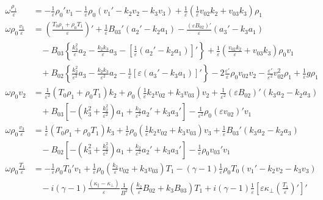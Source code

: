 \documentclass[11pt, fleqn]{article}
\newcommand{\eps}{\varepsilon}
\begin{document}
\begin{equation}
	\begin{aligned}
		\omega \frac{\rho_1}{\eps}		&= -\frac{1}{\eps}\rho_0'v_1 - \frac{1}{\eps}\rho_0\left(v_1' - k_2v_2 - k_3v_3\right) + \frac{1}{\eps}\left(\frac{1}{\eps}v_{02}k_2 + v_{03}k_3\right)\rho_1						\\[8pt]
		\omega \rho_0 \frac{v_1}{\eps}	&= \left(\frac{T_0\rho_1 + \rho_0 T_1}{\eps}\right)' + \frac{1}{\eps}B_{03}'\left(a_2' - k_2a_1\right) - \frac{(\eps B_{02})'}{\eps}\left(a_3' - k_3a_1\right)						\\
										&~~~~ 	- B_{03}\left\{\frac{k_3^2}{\eps}a_2 - \frac{k_2k_3}{\eps}a_3 - \left[\frac{1}{\eps}\left(a_2' - k_2a_1\right)\right]'\right\} 
												+ \frac{1}{\eps}\left(\frac{v_{02}k_2}{\eps}+v_{03}k_3\right)\rho_0v_1																										\\
										&~~~~ 	+ B_{02}\left\{\frac{k_2^2}{\eps^2}a_3 - \frac{k_2k_3}{\eps^2}a_2 - \frac{1}{\eps}\left[\eps\left(a_3' - k_3a_1\right)\right]'\right\} 
												- 2\frac{\eps'}{\eps}\rho_0v_{02}v_2 - \frac{\eps'}{\eps^2}v_{02}^2\rho_1  + \frac{1}{\eps}g\rho_1																		 	\\[8pt]
		\omega \rho_0 v_2				&= \frac{1}{\eps^2}(T_0\rho_1 + \rho_0T_1)k_2 + \rho_0\left(\frac{1}{\eps}k_2v_{02} + k_3v_{03}\right)v_2 + \frac{1}{\eps^2}(\eps B_{02})'\left(k_3a_2 - k_2a_3\right)				\\
										&~~~~ 	+ B_{03}\left[-\left(k_3^2 + \frac{k_2^2}{\eps^2}\right)a_1 + \frac{k_2}{\eps^2}a_2' + k_3a_3'\right] - \frac{1}{\eps^2}\rho_0(\eps v_{02})'v_1								\\[8pt]
		\omega \rho_0 \frac{v_3}{\eps} 	&= \frac{1}{\eps}(T_0 \rho_1 + \rho_0 T_1)k_3 + \frac{1}{\eps}\rho_0\left(\frac{1}{\eps}k_2v_{02} + k_3v_{03}\right)v_3 + \frac{1}{\eps}B_{03}'\left(k_3a_2 - k_2a_3\right)			\\
										&~~~~ 	- B_{02}\left[-\left(k_3^2 + \frac{k_2^2}{\eps^2}\right)a_1 + \frac{k_2}{\eps^2}a_2' + k_3a_3'\right] - \frac{1}{\eps}\rho_0v_{03}'v_1										\\[8pt]
		\omega \rho_0 \frac{T_1}{\eps}	&= -\frac{1}{\eps}\rho_0T_0'v_1 + \frac{1}{\eps}\rho_0\left(\frac{k_2}{\eps}v_{02} + k_3v_{03}\right)T_1 - (\gamma - 1)\frac{1}{\eps}\rho_0T_0\left(v_1' - k_2v_2 - k_3v_3\right) 	\\
										&~~~~ 	- i(\gamma - 1)\frac{(\kappa_\parallel - \kappa_\bot)}{\eps}\frac{1}{B^2}\left(\frac{k_2}{\eps}B_{02} + k_3B_{03}\right)T_1 
												+ i(\gamma -1)\frac{1}{\eps}\left[\eps\kappa_\bot\left(\frac{T_1}{\eps}\right)'\right]'																						\\

\end{aligned}
\end{equation}
\end{document}
